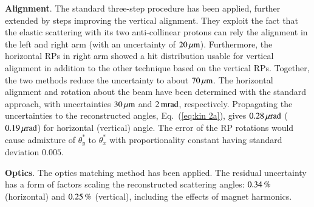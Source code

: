 {\bf Alignment}. The standard three-step procedure \cite{totem-ijmp} has been applied, further extended by steps improving the vertical alignment. They exploit the fact that the elastic scattering with its two anti-collinear protons can rely the alignment in the left and right arm (with an uncertainty of $20\,{\rm \mu m}$). Furthermore, the horizontal RPs in right arm showed a hit distribution usable for vertical alignment in addition to the other technique based on the vertical RPs. Together, the two methods reduce the uncertainty to about $70\,{\rm \mu m}$. The horizontal alignment and rotation about the beam have been determined with the standard approach, with uncertainties $30\,{\rm \mu m}$ and $2\,{\rm m rad}$, respectively. Propagating the uncertainties to the reconstructed angles, Eq.~(\ref{eq:kin 2a}), gives $0.28\,{\rm \mu rad}$ ($0.19\,{\rm \mu rad}$) for horizontal (vertical) angle. The error of the RP rotations would cause admixture of $\theta_y^*$ to $\theta_x^*$ with proportionality constant having standard deviation $0.005$.



{\bf Optics}. The optics matching method \cite{totem-optics} has been applied. The residual uncertainty has a form of factors scaling the reconstructed scattering angles:
$0.34\,{\rm \%}$ (horizontal) and $0.25\,{\rm \%}$ (vertical), including the effects of magnet harmonics.



